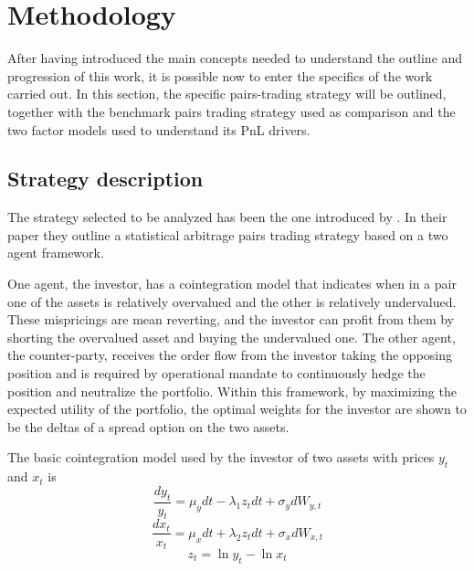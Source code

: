 \section{Methodology}
After having introduced the main concepts needed to understand the outline and progression of this work, it is possible now to enter the specifics of the work carried out. In this section, the specific pairs-trading strategy will be outlined, together with the benchmark pairs trading strategy used as comparison and the two factor models used to understand its PnL drivers.
\subsection{Strategy description}
The strategy selected to be analyzed has been the one introduced by \cite{ioannis_2023}. In their paper they outline a statistical arbitrage pairs trading strategy based on a two agent framework. 

One agent, the investor, has a cointegration model that indicates when in a pair one of the assets is relatively overvalued and the other is relatively undervalued. These mispricings are mean reverting, and the investor can profit from them by shorting the overvalued asset and buying the undervalued one. The other agent, the counter-party, receives the order flow from the investor taking the opposing position and is required by  operational mandate to continuously hedge the position and neutralize the portfolio. Within this framework, by maximizing the expected utility of the portfolio, the optimal weights for the investor are shown to be the deltas of a spread option on the two assets. 

The basic cointegration model used by the investor of two assets with prices $y_t$ and $x_t$ is 
\begin{equation}
    \frac{dy_t}{y_t}=\mu_ydt-\lambda_1z_tdt+\sigma_ydW_{y,t}
\end{equation}
\begin{equation}
    \frac{dx_t}{x_t}=\mu_xdt+\lambda_2z_tdt+\sigma_xdW_{x,t}
\end{equation}
\begin{equation}
    z_t=\ln y_t - \ln x_t
\end{equation}

